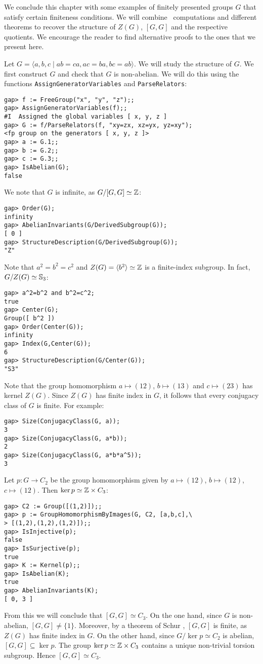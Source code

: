 {\color{blue}
We conclude this chapter with some examples of finitely presented groups $G$ that satisfy certain finiteness conditions.
We will combine \GAP~computations and different theorems to recover the structure of $Z(G)$, $[G,G]$ and the respective quotients.
We encourage the reader to find alternative proofs to the ones that we present here.

\begin{example}
    Let $G=\langle a,b,c\mid ab=ca,ac=ba,bc=ab\rangle$. We will
    study the structure of $G$. 
    We first construct $G$ and check 
    that $G$ is non-abelian. We will 
    do this 
    using the functions 
    \lstinline{AssignGeneratorVariables} and
    \lstinline{ParseRelators}:
\begin{lstlisting}
gap> f := FreeGroup("x", "y", "z");;
gap> AssignGeneratorVariables(f);;
#I  Assigned the global variables [ x, y, z ]
gap> G := f/ParseRelators(f, "xy=zx, xz=yx, yz=xy");
<fp group on the generators [ x, y, z ]>
gap> a := G.1;;
gap> b := G.2;;
gap> c := G.3;;
gap> IsAbelian(G);
false
\end{lstlisting}
    We note that 
    $G$ is infinite, as $G/[G,G]\simeq\mathbb{Z}$:
\begin{lstlisting}
gap> Order(G);
infinity
gap> AbelianInvariants(G/DerivedSubgroup(G));
[ 0 ]
gap> StructureDescription(G/DerivedSubgroup(G));
"Z"
\end{lstlisting}
Note that $a^2=b^2=c^2$ and 
$Z(G)=\langle b^2\rangle\simeq\mathbb{Z}$ is a finite-index subgroup. In fact,
$G/Z(G)\simeq\mathbb{S}_3$:
\begin{lstlisting}
gap> a^2=b^2 and b^2=c^2;
true
gap> Center(G);
Group([ b^2 ])
gap> Order(Center(G));
infinity
gap> Index(G,Center(G));
6
gap> StructureDescription(G/Center(G));
"S3"
\end{lstlisting}
Note that the group homomorphism $a\mapsto (12)$, $b\mapsto (13)$ 
and $c\mapsto (23)$ 
has kernel $Z(G)$. 
Since $Z(G)$ has finite index in $G$, it follows 
that every conjugacy class of $G$ 
is finite. For example:
\begin{lstlisting}
gap> Size(ConjugacyClass(G, a));
3
gap> Size(ConjugacyClass(G, a*b));
2
gap> Size(ConjugacyClass(G, a*b*a^5));
3
\end{lstlisting}
Let $p\colon G\to C_2$ be the group homomorphism
given by $a\mapsto (12)$, $b\mapsto (12)$, $c\mapsto (12)$. 
Then $\ker p \simeq \mathbb{Z} \times C_3$: 
\begin{lstlisting}
gap> C2 := Group([(1,2)]);;
gap> p := GroupHomomorphismByImages(G, C2, [a,b,c],\ 
> [(1,2),(1,2),(1,2)]);;
gap> IsInjective(p);
false
gap> IsSurjective(p);
true
gap> K := Kernel(p);;
gap> IsAbelian(K);
true
gap> AbelianInvariants(K);
[ 0, 3 ]
\end{lstlisting}
From this we will conclude that $[G,G] \simeq C_3$. On the one hand, 
since $G$ is non-abelian, $[G,G]\ne\{1\}$.  
Moreover, by a theorem of Schur \cite[Theorem 5.7]{MR2426855}, $[G,G]$ is finite, 
as $Z(G)$ has finite index in $G$.
On the other hand, since $G/\ker p\simeq C_2$ is abelian, 
$[G,G]\subseteq \ker p$. The group $\ker p\simeq\mathbb{Z}\times C_3$ contains
a unique non-trivial torsion subgroup. Hence 
$[G,G]\simeq C_3$. 
\end{example}

}
